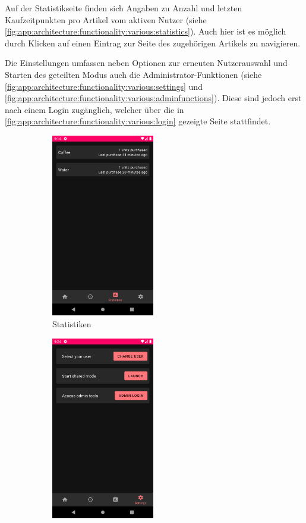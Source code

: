 \documentclass[a4paper, 11pt]{article}
\begin{document}
Auf der Statistikseite finden sich Angaben zu Anzahl und letzten Kaufzeitpunkten pro Artikel vom aktiven Nutzer (siehe \autoref{fig:app:architecture:functionality:various:statistics}).
Auch hier ist es möglich durch Klicken auf einen Eintrag zur Seite des zugehörigen Artikels zu navigieren.

Die Einstellungen umfassen neben Optionen zur erneuten Nutzerauswahl und Starten des geteilten Modus auch die Administrator-Funktionen (siehe \autoref{fig:app:architecture:functionality:various:settings} und \autoref{fig:app:architecture:functionality:various:adminfunctions}).
Diese sind jedoch erst nach einem Login zugänglich, welcher über die in \autoref{fig:app:architecture:functionality:various:login} gezeigte Seite stattfindet.
\begin{figure}[]
	\begin{subfigure}{.5\textwidth}
		\centering
		\includegraphics[height=8cm,keepaspectratio]{./images/screenshots/statistics.png}
		\caption{Statistiken}
		\label{fig:app:architecture:functionality:various:statistics}
	\end{subfigure}
	\begin{subfigure}{.5\textwidth}
		\centering
		\includegraphics[height=8cm,keepaspectratio]{./images/screenshots/settings.png}

\end{subfigure}
\end{figure}
\end{document}
